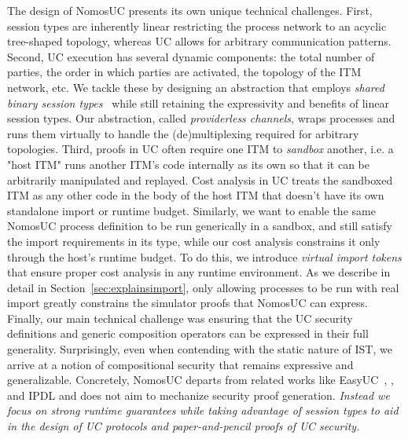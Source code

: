 The design of NomosUC presents its own unique technical challenges.  First,
session types are inherently linear restricting the process network to an
acyclic tree-shaped topology, whereas UC allows for arbitrary communication
patterns.  Second, UC execution has several dynamic components: the total
number of parties, the order in which parties are activated, the topology of
the ITM network, etc.  We tackle these by designing an abstraction that employs
\emph{shared binary session types}~\cite{balzer2017manifest} while still
retaining the expressivity and benefits of linear session types.  Our
abstraction, called \emph{providerless channels}, wraps processes and runs them
virtually to handle the (de)multiplexing required for arbitrary topologies.
Third, proofs in UC often require one ITM to \emph{sandbox} another, i.e. a
"host ITM" runs another ITM's code internally as its own so that it can be
arbitrarily manipulated and replayed.  Cost analysis in UC treats the sandboxed
ITM as any other code in the body of the host ITM that doesn't have its own
standalone import or runtime budget.  Similarly, we want to enable the same
NomosUC process definition to be run generically in a sandbox, and still
satisfy the import requirements in its type, while our cost analysis constrains
it only through the host's runtime budget.  To do this, we introduce
\emph{virtual import tokens} that ensure proper cost analysis in any runtime
environment.  As we describe in detail in Section~\ref{sec:explainsimport},
only allowing processes to be run with real import greatly constrains the
simulator proofs that NomosUC can express.
Finally, our main technical challenge was ensuring that the UC security
definitions and generic composition operators can be expressed in their full
generality.  Surprisingly, even when contending with the static nature of IST, we
arrive at a notion of compositional security that remains expressive and
generalizable.  Concretely, NomosUC departs from related works like
EasyUC~\cite{easyuc}, \cite{barbosa}, and IPDL\cite{ipdl} and does not aim to
mechanize security proof generation.  \emph{Instead we focus on strong runtime
guarantees while taking advantage of session types to aid in the design of UC
protocols and paper-and-pencil proofs of UC security.}

